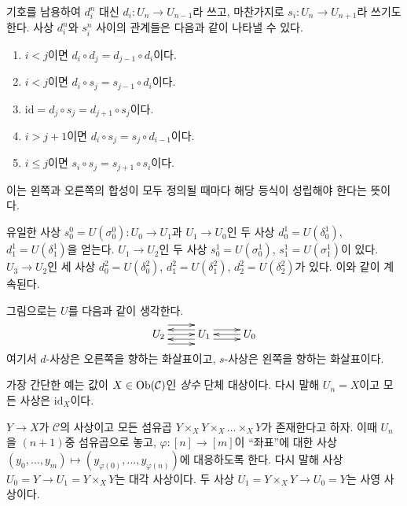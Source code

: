 \begin{remark}
\label{remark-relations}
기호를 남용하여 $d^n_i$ 대신 $d_i : U_n \to U_{n - 1}$라 쓰고,
마찬가지로 $s_i : U_n \to U_{n + 1}$라 쓰기도 한다.
사상 $d^n_i$와 $s^n_i$ 사이의 관계들은 다음과 같이 나타낼 수 있다.
\begin{enumerate}
\item $i < j$이면 $d_i \circ d_j = d_{j - 1} \circ d_i$이다.
\item $i < j$이면 $d_i \circ s_j = s_{j - 1} \circ d_i$이다.
\item $\text{id} = d_j \circ s_j = d_{j + 1} \circ s_j$이다.
\item $i > j + 1$이면 $d_i \circ s_j = s_j \circ d_{i - 1}$이다.
\item $i \leq j$이면 $s_i \circ s_j = s_{j + 1} \circ s_i$이다.
\end{enumerate}
이는 왼쪽과 오른쪽의 합성이 모두 정의될 때마다 해당 등식이
성립해야 한다는 뜻이다.
\end{remark}

\noindent
유일한 사상 $s^0_0 = U(\sigma^0_0) : U_0 \to U_1$과
$U_1 \to U_0$인 두 사상 $d^1_0 = U(\delta^1_0)$,
$d^1_1 = U(\delta^1_1)$을 얻는다.
$U_1 \to U_2$인 두 사상
$s^1_0 = U(\sigma^1_0)$, $s^1_1 = U(\sigma^1_1)$이 있다.
$U_3 \to U_2$인 세 사상
$d^2_0 = U(\delta^2_0)$, $d^2_1 = U(\delta^2_1)$,
$d^2_2 = U(\delta^2_2)$가 있다. 이와 같이 계속된다.

\medskip\noindent
그림으로는 $U$를 다음과 같이 생각한다.
$$
\xymatrix{
U_2
\ar@<2ex>[r]
\ar@<0ex>[r]
\ar@<-2ex>[r]
&
U_1
\ar@<1ex>[r]
\ar@<-1ex>[r]
\ar@<1ex>[l]
\ar@<-1ex>[l]
&
U_0
\ar@<0ex>[l]
}
$$
여기서 $d$-사상은 오른쪽을 향하는 화살표이고,
$s$-사상은 왼쪽을 향하는 화살표이다.

\begin{example}
\label{example-constant-simplicial-object}
가장 간단한 예는 값이 $X \in \mathop{\mathrm{Ob}}\nolimits(\mathcal{C})$인
{\it 상수} 단체 대상이다. 다시 말해 $U_n = X$이고
모든 사상은 $\text{id}_X$이다.
\end{example}

\begin{example}
\label{example-fibre-products-simplicial-object}
$Y\to X$가 $\mathcal{C}$의 사상이고 모든 섬유곱
$Y \times_X Y \times_X \ldots \times_X Y$가 존재한다고 하자.
이때 $U_n$을 $(n + 1)$중 섬유곱으로 놓고,
$\varphi : [n] \to [m]$이 ``좌표''에 대한 사상
$(y_0, \ldots, y_m) \mapsto (y_{\varphi(0)}, \ldots, y_{\varphi(n)})$에
대응하도록 한다. 다시 말해 사상
$U_0 = Y \to U_1 = Y \times_X Y$는 대각 사상이다.
두 사상 $U_1 = Y \times_X Y \to U_0 = Y$는 사영 사상이다.
\end{example}

